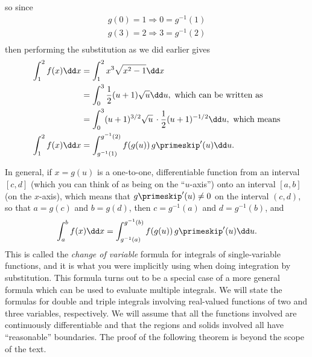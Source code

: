 so since
\begin{align*}
 g(0) = 1 \Rightarrow 0 = g^{-1} (1)\\
 g(3) = 2 \Rightarrow 3 = g^{-1} (2)\\
\end{align*}
then performing the substitution as we did earlier gives
\begin{align*}
 \int_1^2 f(x)\dd x &= \int_1^2 x^3 \sqrt{x^2 - 1}\dd x\\
 &= \int_0^3 \frac12(u+1)\sqrt{u}\dd u ,\text{ which can be written as}\\
 &= \int_0^3 (u+1)^{3/2} \sqrt{u} \, \cdot \frac12 (u+1)^{-1/2}\dd u ,\text{ which means}\\
 \int_1^2 f(x)\dd x &= \int_{g^{-1}(1)}^{g^{-1}(2)} f(g(u))\,g\primeskip'(u)\dd u .
\end{align*}

In general, if $x = g(u)$ is a one-to-one, differentiable function from an interval $[ c,d ]$ (which you can think of as being on the ``$u$-axis'') onto an interval $[ a,b ]$ (on the $x$-axis), which means that $g\primeskip'(u) \ne 0$ on the interval $(c,d)$, so that $a=g(c)$ and $b=g(d)$, then $c=g^{-1}(a)$ and $d=g^{-1}(b)$, and
\[\int_a^b f(x)\dd x = \int_{g^{-1}(a)}^{g^{-1}(b)} f(g(u))\,g\primeskip'(u)\dd u .\]
This is called the \emph{change of variable} formula for integrals of single-variable functions, and it is what you were implicitly using when doing integration by substitution. This formula turns out to be a special case of a more general formula which can be used to evaluate multiple integrals. We will state the formulas for double and triple integrals involving real-valued functions of two and three variables, respectively. We will assume that all the functions involved are continuously differentiable and that the regions and solids involved all have ``reasonable'' boundaries. The proof of the following theorem is beyond the scope of the text.%

